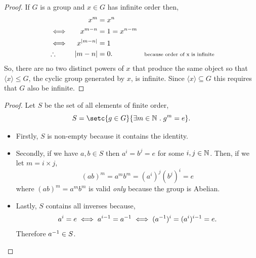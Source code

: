 \documentclass[MathsNotesBase.tex]{subfiles}
\begin{document}
{	
	\begin{proof}
		If $G$ is a group and ${ x \in G }$ has infinite order then,
		\begin{align*}
		&& x^m &= x^n \\
		&\iff & x^{m-n} &= 1= x^{n-m} &\text{\scriptsize{}} \\
		&\iff & x^{\left\lvert m-n\right\rvert} &= 1 &\text{\scriptsize{}} \\
		&\therefore & \left\lvert m-n\right\rvert &= 0. &\text{\scriptsize{because order of x is infinite}} \\
		\end{align*}
		So, there are no two distinct powers of $x$ that produce the same object so that ${ \langle x \rangle \leq G }$, the cyclic group generated by $x$, is infinite. Since ${ \langle x \rangle \subseteq G }$ this requires that $G$ also be infinite.
	\end{proof}

	\bigskip

	\bigskip
	\begin{proof}
		Let $S$ be the set of all elements of finite order,
		\[ S = \setc{g \in G}{\exists m \in \N{} \logicsep g^m = e}. \]
		\begin{itemize}
			\item{Firstly, $S$ is non-empty because it contains the identity.}
			\item{Secondly, if we have ${ a,b \in S }$ then ${ a^i = b^j = e }$ for some ${ i,j \in \mathbb{N}^{} }$. Then, if we let ${ m = i \times j }$,
				\[ (ab)^m = a^mb^m = (a^i)^j(b^j)^i = e \]
				where ${ (ab)^m = a^mb^m }$ is valid \textit{only} because the group is Abelian.
			}
			\item{Lastly, $S$ contains all inverses because,
				\[ a^i = e \iff a^{i-1} = {a}^{-1} \iff ({a}^{-1})^i = (a^i)^{i-1} = e. \]
				Therefore ${ {a}^{-1} \in S }$.
			}
		\end{itemize}		
	\end{proof}

}
\end{document}
